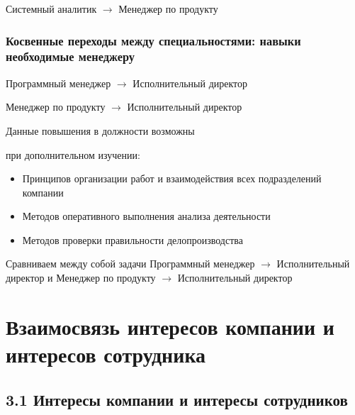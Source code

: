 \documentclass{../industrial-development}
\begin{document}
Системный аналитик $\rightarrow$ Менеджер по продукту


\begin{frame} \frametitle{Косвенные переходы между специальностями: навыки необходимые менеджеру}

\begin{block}{Программный менеджер $\rightarrow$ Исполнительный директор 

Менеджер по продукту  $\rightarrow$ Исполнительный директор }

Данные повышения в должности возможны 

при дополнительном изучении:
  \end{block}
 \begin{itemize}
  \item Принципов организации работ и взаимодействия всех подразделений компании
  \item Методов оперативного выполнения анализа деятельности
  \item Методов проверки правильности делопроизводства
  \end{itemize}
\end{frame}



\lecturenotes

Сравниваем между собой задачи Программный менеджер $\rightarrow$ Исполнительный директор и
Менеджер по продукту  $\rightarrow$ Исполнительный директор




\section{Взаимосвязь интересов компании и интересов сотрудника }

\subsection{3.1 Интересы компании и интересы сотрудников }
\end{document}
